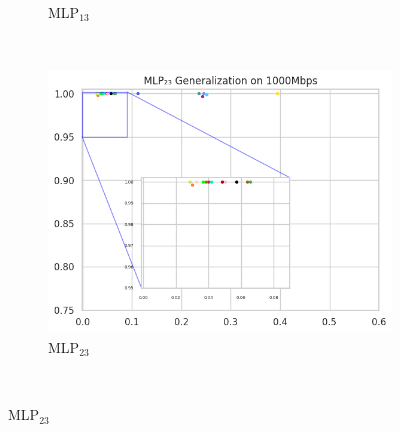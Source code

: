 \documentclass[a4paper,fleqn]{cas-sc}
\begin{document}
\begin{figure}[h!]
\begin{minipage}[t]{0.46\textwidth}
\begin{subfigure}[t]{0.33\textwidth}
			\caption{MLP$_{13}$}
			\label{fig:Generalizacao-MLP13-1000Mbps}
		\end{subfigure}%
		~
		\begin{subfigure}[t]{0.33\textwidth}
			\includegraphics[draft=false, width=\textwidth]{./figs/Generalizacao-MLP23-1000Mbps.png} 
			\caption{MLP$_{23}$}
			\label{fig:Generalizacao-MLP23-1000Mbps}
		\end{subfigure}%
		~
		

\end{minipage}
\end{figure}
\end{document}
